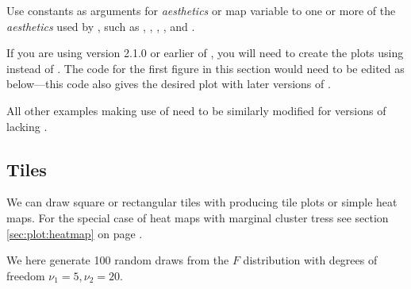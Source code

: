 \documentclass[krantz2]{krantz}\usepackage{knitr}%
\begin{document}
\begin{playground}
Use constants as arguments for \emph{aesthetics} or map variable  to one or more of the \emph{aesthetics} used by , such as , , , ,  and .
\end{playground}

\begin{warningbox}
If you are using version 2.1.0 or earlier of \ggplot, you will need to create the plots using  instead of . The code for the first figure in this section would need to be edited as below---this code also gives the desired plot with later versions of \ggplot.

\begin{knitrout}\footnotesize
{}\color{fgcolor}\begin{kframe}
\begin{alltt}
\hlstd{(} \hlopt{==} \hlstd{),}
       \hlstd{(}    \hlopt{+}
   \hlstd{(} \hlstd{=} \hlstd{)}
\end{alltt}
\end{kframe}
\end{knitrout}

All other examples making use of   need to be similarly modified for versions of \ggplot lacking .
\end{warningbox}


\subsection{Tiles}\label{sec:tileplot}
We can draw square or rectangular tiles with  producing tile plots or simple heat maps.
For the special case of heat maps with marginal cluster tress see section \ref{sec:plot:heatmap} on page \pageref{sec:plot:heatmap}.

We here generate 100 random draws from the $F$ distribution with degrees of freedom $\nu_1 = 5, \nu_2 = 20$.
\end{document}
